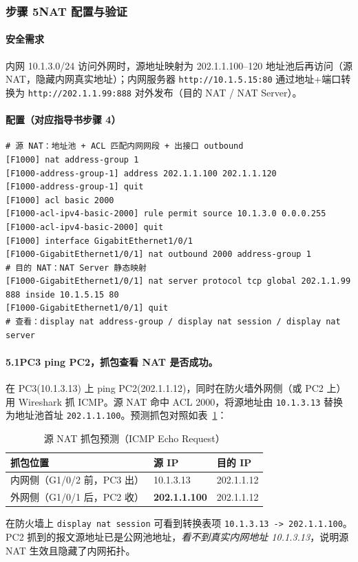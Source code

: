 \documentclass[12pt,a4paper]{article}
\begin{document}
\subsubsection*{步骤 5\quad NAT 配置与验证}
\paragraph{安全需求}内网 10.1.3.0/24 访问外网时，源地址映射为 202.1.1.100--120 地址池后再访问（源 NAT，隐藏内网真实地址）；内网服务器 \texttt{http://10.1.5.15:80} 通过地址+端口转换为 \texttt{http://202.1.1.99:888} 对外发布（目的 NAT / NAT Server）。

\paragraph{配置（对应指导书步骤 4）}
\begin{lstlisting}
# 源 NAT：地址池 + ACL 匹配内网网段 + 出接口 outbound
[F1000] nat address-group 1
[F1000-address-group-1] address 202.1.1.100 202.1.1.120
[F1000-address-group-1] quit
[F1000] acl basic 2000
[F1000-acl-ipv4-basic-2000] rule permit source 10.1.3.0 0.0.0.255
[F1000-acl-ipv4-basic-2000] quit
[F1000] interface GigabitEthernet1/0/1
[F1000-GigabitEthernet1/0/1] nat outbound 2000 address-group 1
# 目的 NAT：NAT Server 静态映射
[F1000-GigabitEthernet1/0/1] nat server protocol tcp global 202.1.1.99 888 inside 10.1.5.15 80
[F1000-GigabitEthernet1/0/1] quit
# 查看：display nat address-group / display nat session / display nat server
\end{lstlisting}

\paragraph{5.1\quad PC3 ping PC2，抓包查看 NAT 是否成功。}
在 PC3(10.1.3.13) 上 ping PC2(202.1.1.12)，同时在防火墙外网侧（或 PC2 上）用 Wireshark 抓 ICMP。源 NAT 命中 ACL 2000，将源地址由 \texttt{10.1.3.13} 替换为地址池首址 \texttt{202.1.1.100}。预测抓包对照如表~\ref{tab:natsnat}：
\begin{table}[H]
\centering\caption{源 NAT 抓包预测（ICMP Echo Request）}\label{tab:natsnat}
\small
\begin{tabular}{@{}lll@{}}
\toprule
抓包位置 & 源 IP & 目的 IP \\
\midrule
内网侧（G1/0/2 前，PC3 出） & 10.1.3.13 & 202.1.1.12 \\
外网侧（G1/0/1 后，PC2 收） & \textbf{202.1.1.100} & 202.1.1.12 \\
\bottomrule
\end{tabular}
\end{table}
在防火墙上 \texttt{display nat session} 可看到转换表项 \texttt{10.1.3.13 -> 202.1.1.100}。PC2 抓到的报文源地址已是公网池地址，\emph{看不到真实内网地址 10.1.3.13}，说明源 NAT 生效且隐藏了内网拓扑。
\end{document}
